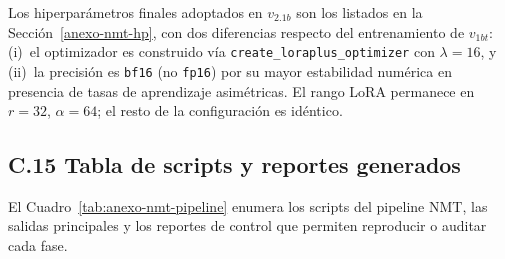 \documentclass[12pt,a4paper,oneside]{book}
\begin{document}
Los hiperparámetros finales adoptados en \(v_{2.1b}\) son los listados en la Sección~\ref{anexo-nmt-hp}, con dos diferencias respecto del entrenamiento de \(v_{1bt}\): (i)~el optimizador es construido vía \texttt{create\_loraplus\_optimizer} con \(\lambda=16\), y (ii)~la precisión es \texttt{bf16} (no \texttt{fp16}) por su mayor estabilidad numérica en presencia de tasas de aprendizaje asimétricas. El rango LoRA permanece en \(r=32\), \(\alpha=64\); el resto de la configuración es idéntico.

\subsection*{C.15 Tabla de scripts y reportes generados}\label{anexo-nmt-scripts}

El Cuadro~\ref{tab:anexo-nmt-pipeline} enumera los scripts del pipeline NMT, las salidas principales y los reportes de control que permiten reproducir o auditar cada fase.
\end{document}
